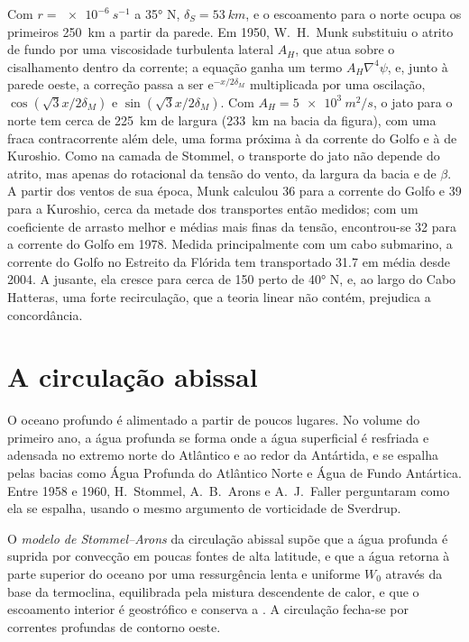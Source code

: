 Com $r = \qty{e-6}{s^{-1}}$ a \ang{35} N, $\delta_S = \qty{53}{km}$, e
o escoamento para o norte ocupa os primeiros \qty{250}{km} a partir da parede. Em 1950,
W.~H.~Munk substituiu o atrito de fundo por uma viscosidade turbulenta lateral $A_H$,
que atua sobre o cisalhamento dentro da corrente; a equação ganha um termo
$A_H\nabla^4\psi$, e, junto à parede oeste, a correção passa a ser
$\mathrm e^{-x/2\delta_M}$ multiplicada por uma oscilação, $\cos(\sqrt3x/2\delta_M)$
e $\sin(\sqrt3x/2\delta_M)$. Com $A_H = \qty{5e3}{m^2/s}$, o jato para o norte
tem cerca de \qty{225}{km} de largura (\qty{233}{km} na bacia da figura),
com uma fraca contracorrente além dele, uma forma próxima à da corrente do Golfo e
à de Kuroshio. Como na camada de Stommel, o transporte do jato não
depende do atrito, mas apenas do rotacional da tensão do vento, da largura da
bacia e de $\beta$. A partir dos ventos de sua época, Munk calculou
\qty{36}{\sverdrup} para a corrente do Golfo e \qty{39}{\sverdrup} para a
Kuroshio, cerca da metade dos transportes então medidos; com um coeficiente de arrasto melhor
e médias mais finas da tensão, encontrou-se \qty{32}{\sverdrup}
para a corrente do Golfo em 1978. Medida principalmente com um cabo submarino, a
corrente do Golfo no Estreito da Flórida tem transportado \qty{31.7}{\sverdrup} em
média desde 2004. A jusante, ela cresce para cerca de \qty{150}{\sverdrup} perto de
\ang{40} N, e, ao largo do Cabo Hatteras, uma forte recirculação, que a teoria linear
não contém, prejudica a concordância.

\section{A circulação abissal}\label{sec:b3:ocean-dynamics:abyssal}

O oceano profundo é alimentado a partir de poucos lugares. No volume do primeiro ano, a água
profunda se forma onde a água superficial é resfriada e adensada no extremo norte
do Atlântico e ao redor da Antártida, e se espalha pelas bacias como Água Profunda do
Atlântico Norte e Água de Fundo Antártica. Entre 1958 e 1960,
H.~Stommel, A.~B.~Arons e A.~J.~Faller perguntaram como ela se espalha, usando o
mesmo argumento de vorticidade de Sverdrup.

\begin{definition}\label{def:b3:ocean-dynamics:abyssal}
O \emph{modelo de Stommel--Arons} da circulação abissal
supõe que a água profunda é suprida por convecção em poucas
fontes de alta latitude, e que a água retorna à parte superior do oceano por uma
ressurgência lenta e uniforme $W_0$ através da base da termoclina, equilibrada pela
mistura descendente de calor, e que o escoamento interior é geostrófico e conserva a
. A circulação fecha-se por correntes profundas de contorno
oeste.
\end{definition}

